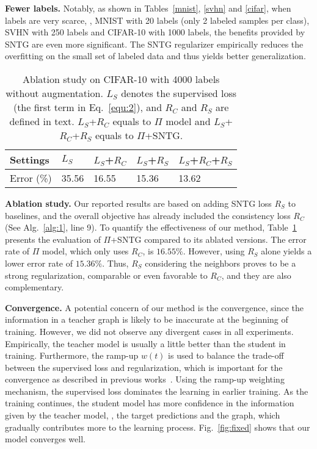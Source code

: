 \documentclass[10pt,twocolumn,letterpaper]{article}
\begin{document}
\textbf{Fewer labels.} Notably, as shown in Tables~\ref{mnist}, \ref{svhn} and \ref{cifar}, when labels are very scarce, \eg, MNIST with 20 labels (only 2 labeled samples per class), SVHN with 250 labels and CIFAR-10 with 1000 labels, the benefits provided by SNTG are even more significant. The SNTG regularizer empirically reduces the overfitting on the small set of labeled data and thus yields better generalization.

\begin{table}[t]\vspace{-.05cm}
	\caption{Ablation study on CIFAR-10 with 4000 labels without augmentation. $L_S$ denotes the supervised loss (the first term in Eq.~\ref{equ:2}), and $R_C$ and $R_S$ are defined in text. $L_S$+$R_C$ equals to $\Pi$ model and $L_S$+$R_C$+$R_S$ equals to $\Pi$+SNTG.}\vspace{-.2cm}
	\label{ablation}
	\centering
	\begin{tabular}{lllll}
		\toprule
		Settings 	&$L_S$	&$L_S$+$R_C$	&$L_S$+$R_S$	&$L_S$+$R_C$+$R_S$\\
		\midrule
		Error (\%) 	&35.56	&16.55		&15.36		&13.62\\
		\bottomrule
	\end{tabular}\vspace{-.4cm}
\end{table}
\textbf{Ablation study.}
Our reported results are based on adding SNTG loss $R_S$ to baselines, and the overall objective has already included the consistency loss $R_C$ (See Alg.~\ref{alg:1}, line 9). To quantify the effectiveness of our method, Table~\ref{ablation} presents the evaluation of $\Pi$+SNTG compared to its ablated versions. The error rate of $\Pi$ model, which only uses $R_C$, is $16.55\%$. However, using $R_S$ alone yields a lower error rate of $15.36\%$. Thus, $R_S$ considering the neighbors proves to be a strong regularization, comparable or even favorable to $R_C$, and they are also complementary.


\textbf{Convergence.}
A potential concern of our method is the convergence, since the information in a teacher graph is
likely to be inaccurate at the beginning of training. However, we did not observe any divergent cases in all experiments.
Empirically, the teacher model is usually a little better than the student in training.
Furthermore, the ramp-up $w(t)$ is used to balance the trade-off between the supervised loss and regularization, which is important for the convergence as described in previous works~\cite{laine2016temporal,tarvainen2017mean}.
Using the ramp-up weighting mechanism, the supervised loss dominates the learning in earlier training.
As the training continues, the student model has more confidence in the information given by the teacher model, \ie, the target predictions and the graph, which gradually contributes more to the learning process. Fig.~\ref{fig:fixed} shows that our model converges well.
\end{document}
